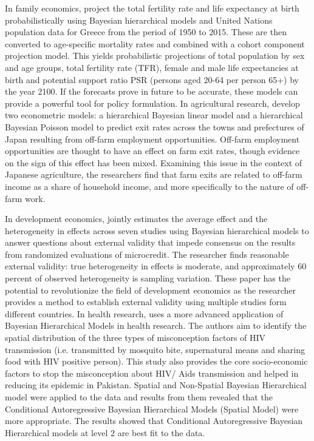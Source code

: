 In family economics, \cite{lamnisos2019demographic} project the total fertility rate and life expectancy at birth probabilistically using Bayesian hierarchical models and United Nations population data for Greece from the period of 1950 to 2015. These are then converted to age-specific mortality rates and combined with a cohort component projection model. This yields probabilistic projections of total population by sex and age groups, total fertility rate (TFR), female and male life expectancies at birth and potential support ratio PSR (persons aged 20-64 per person 65+) by the year 2100. If the forecasts prove in future to be accurate, these models can provide a powerful tool for policy formulation. In agricultural research, \cite{ ramsey2019saying} develop two econometric models: a hierarchical Bayesian linear model and a hierarchical Bayesian Poisson model to predict exit rates across the towns and prefectures of Japan resulting from off-farm employment opportunities. Off-farm employment opportunities are thought to have an effect on farm exit rates, though evidence on the sign of this effect has been mixed. Examining this issue in the context of Japanese agriculture, the researchers find that farm exits are related to off-farm income as a share of household income, and more specifically to the nature of off-farm work.  

In development economics, \cite{ meager2019understanding} jointly estimates the average effect and the heterogeneity in effects across seven studies using Bayesian hierarchical models to answer questions about external validity that impede consensus on the results from randomized evaluations of microcredit. The researcher finds reasonable external validity: true heterogeneity in effects is moderate, and approximately 60 percent of observed heterogeneity is sampling variation. These paper has the potential to revolutionize the field of development economics as the researcher provides a method to establish external validity using multiple studies form different countries. In health research, \cite{ rashid2019socio} uses a more advanced application of Bayesian Hierarchical Models in health research. The authors aim to identify the spatial distribution of the three types of misconception factors of HIV transmission (i.e. transmitted by mosquito bite, supernatural means and sharing food with HIV positive person). This study also provides the core socio-economic factors to stop the misconception about HIV/ Aids transmission and helped in reducing its epidemic in Pakistan. Spatial and Non-Spatial Bayesian Hierarchical model were applied to the data and results from them revealed that the Conditional Autoregressive Bayesian Hierarchical Models (Spatial Model) were more appropriate. The results showed that Conditional Autoregressive Bayesian Hierarchical models at level 2 are best fit to the data.


